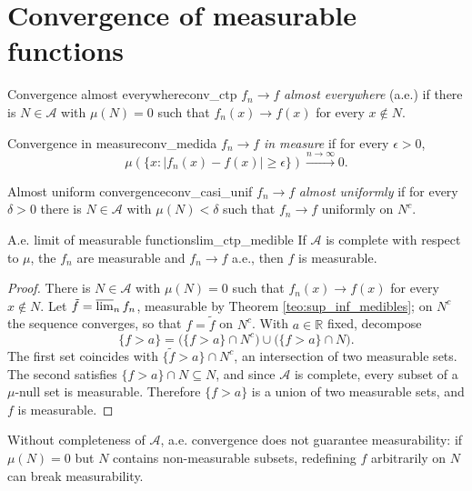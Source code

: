 \documentclass[11pt, a4paper]{article}
\begin{document}
\newpage

\section{Convergence of measurable functions}

\begin{definicion}{Convergence almost everywhere}{conv_ctp}
$f_n \to f$ \emph{almost everywhere} (a.e.) if there is $N \in \mathcal{A}$ with
$\mu(N) = 0$ such that $f_n(x) \to f(x)$ for every $x \notin N$.
\end{definicion}

\begin{definicion}{Convergence in measure}{conv_medida}
$f_n \to f$ \emph{in measure} if for every $\epsilon > 0$,
$$ \mu(\{x : |f_n(x) - f(x)| \ge \epsilon\}) \xrightarrow{n \to \infty} 0. $$
\end{definicion}

\begin{definicion}{Almost uniform convergence}{conv_casi_unif}
$f_n \to f$ \emph{almost uniformly} if for every $\delta > 0$ there is $N \in \mathcal{A}$ with
$\mu(N) < \delta$ such that $f_n \to f$ uniformly on $N^c$.
\end{definicion}

\begin{corolario}{A.e. limit of measurable functions}{lim_ctp_medible}
If $\mathcal{A}$ is complete with respect to $\mu$, the $f_n$ are measurable and $f_n \to f$ a.e.,
then $f$ is measurable.
\end{corolario}

\begin{proof}
There is $N \in \mathcal{A}$ with $\mu(N) = 0$ such that $f_n(x) \to f(x)$ for every $x \notin N$. Let
$\tilde f = \varlimsup_n f_n$, measurable by Theorem \ref{teo:sup_inf_medibles}; on $N^c$ the
sequence converges, so that $f = \tilde f$ on $N^c$. With $a \in \mathbb{R}$ fixed, decompose
$$ \{f > a\} = \big(\{f > a\} \cap N^c\big) \cup \big(\{f > a\} \cap N\big). $$
The first set coincides with $\{\tilde f > a\} \cap N^c$, an intersection of two measurable sets. The
second satisfies $\{f > a\} \cap N \subseteq N$, and since $\mathcal{A}$ is complete, every subset
of a $\mu$-null set is measurable. Therefore $\{f > a\}$ is a union of two measurable sets, and $f$ is
measurable.
\end{proof}

\obs Without completeness of $\mathcal{A}$, a.e. convergence does not guarantee measurability: if
$\mu(N) = 0$ but $N$ contains non-measurable subsets, redefining $f$ arbitrarily on $N$
can break measurability.
\end{document}
